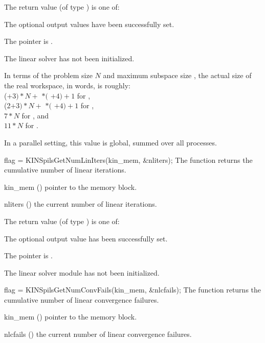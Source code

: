 {
  The return value  (of type ) is one of:
  \begin{args}
  \item[\Id{KINSPILS\_SUCCESS}] 
    The optional output values have been successfully set.
  \item[\Id{KINSPILS\_MEM\_NULL}]
    The  pointer is .
  \item[\Id{KINSPILS\_LMEM\_NULL}]
    The linear solver has not been initialized.
  \end{args}
}
{
  In terms of the problem size $N$ and maximum subspace size , 
  the actual size of the real workspace, in  words, is roughly:\\
  ($+ 3)*N +$  $*($ $ + 4) + 1$ for {\kinspgmr},\\
  (2$+ 3)*N +$  $*($ $ + 4) + 1$ for {\kinspfgmr},\\
  $7*N$  for {\kinspbcg}, and \\
  $11*N$ for {\kinsptfqmr}.

  In a parallel setting, this value is global, summed over all processes.
}
{
  flag = KINSpilsGetNumLinIters(kin\_mem, \&nliters);
}
{
  The function  returns the
  cumulative number of linear iterations.
}
{
  \begin{args}
  \item[kin\_mem] ()
    pointer to the {\kinsol} memory block.
  \item[nliters] ()
    the current number of linear iterations.
  \end{args}
}
{
  The return value  (of type ) is one of:
  \begin{args}
  \item[\Id{KINSPILS\_SUCCESS}] 
    The optional output value has been successfully set.
  \item[\Id{KINSPILS\_MEM\_NULL}]
    The  pointer is .
  \item[\Id{KINSPLIS\_LMEM\_NULL}]
    The linear solver module has not been initialized.
  \end{args}
}
{}
{
  flag = KINSpilsGetNumConvFails(kin\_mem, \&nlcfails);
}
{
  The function  returns the
  cumulative number of linear convergence failures.
}
{
  \begin{args}
  \item[kin\_mem] ()
    pointer to the {\kinsol} memory block.
  \item[nlcfails] ()
    the current number of linear convergence failures.
  \end{args}
}
